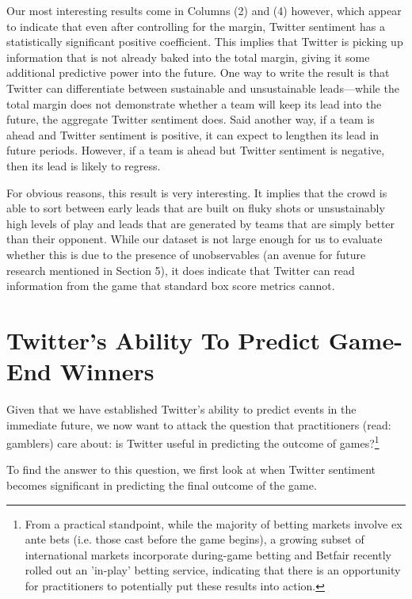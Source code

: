 \documentclass[12pt]{article}
\begin{document}
\begin{doublespacing}
Our most interesting results come in Columns (2) and (4) however, which appear to indicate that even after controlling for the margin, Twitter sentiment has a statistically significant positive coefficient. This implies that Twitter is picking up information that is not already baked into the total margin, giving it some additional predictive power into the future. One way to write the result is that Twitter can differentiate between sustainable and unsustainable leads---while the total margin does not demonstrate whether a team will keep its lead into the future, the aggregate Twitter sentiment does. Said another way, if a team is ahead and Twitter sentiment is positive, it can expect to lengthen its lead in future periods. However, if a team is ahead but Twitter sentiment is negative, then its lead is likely to regress. 

For obvious reasons, this result is very interesting. It implies that the crowd is able to sort between early leads that are built on fluky shots or unsustainably high levels of play and leads that are generated by teams that are simply better than their opponent. While our dataset is not large enough for us to evaluate whether this is due to the presence of unobservables (an avenue for future research mentioned in Section 5), it does indicate that Twitter can read information from the game that standard box score metrics cannot.

\section*{Twitter's Ability To Predict Game-End Winners}

Given that we have established Twitter's ability to predict events in the immediate future, we now want to attack the question that practitioners (read: gamblers) care about: is Twitter useful in predicting the outcome of games?\footnote{From a practical standpoint, while the majority of betting markets involve ex ante bets (i.e. those cast before the game begins), a growing subset of international markets incorporate during-game betting and Betfair recently rolled out an 'in-play' betting service, indicating that there is an opportunity for practitioners to potentially put these results into action.}

To find the answer to this question, we first look at when Twitter sentiment becomes significant in predicting the final outcome of the game. 


\end{doublespacing}
\end{document}
